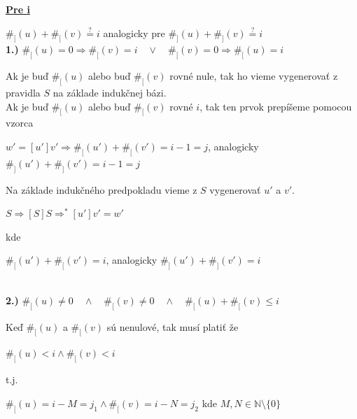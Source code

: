 \documentclass[11pt,a4paper]{article}
\begin{document}
\newpage
\underline{\textbf{Pre i}}
\begin{flushright}
\begin{minipage}{0.95\textwidth}

    $\#_{[}(u) + \#_{[}(v) \stackrel{\text{?}}{=} i$ analogicky pre $\#_{]}(u) + \#_{]}(v) \stackrel{\text{?}}{=} i$\\

    \textbf{1.)} $\#_{[}(u) = 0 \Rightarrow \#_{[}(v) = i \quad \vee \quad \#_{[}(v) = 0 \Rightarrow \#_{[}(u) = i$\\[-1em]
    \begin{flushright}
    \begin{minipage}{0.95\textwidth}
        Ak je buď $\#_{[}(u)$ alebo buď $\#_{[}(v)$ rovné nule, tak ho vieme vygenerovať z pravidla $S$ na základe indukčnej bázi.\\

        Ak je buď $\#_{[}(u)$ alebo buď $\#_{[}(v)$ rovné $i$, tak ten prvok prepíšeme pomocou vzorca
        \begin{center}
        $w'=[u']v' \Rightarrow \#_{[}(u') + \#_{[}(v') = i-1 = j$, analogicky $\#_{]}(u') + \#_{]}(v') = i-1 = j$
        \end{center}
        Na základe indukčného predpokladu vieme z $S$ vygenerovať $u'$ a $v'$.
        \begin{center}
            $S \Rightarrow [S]S \Rightarrow^{*} [u']v' = w'$
        \end{center}
        kde
        \begin{center}
            $\#_{[}(u') + \#_{[}(v') = i$, analogicky $\#_{]}(u') + \#_{]}(v') = i$
        \end{center}
    \end{minipage}
    \end{flushright}

    \hfill\\[-1em]

    \textbf{2.)} $\#_{[}(u) \neq 0 \quad \wedge \quad \#_{[}(v) \neq 0 \quad \wedge \quad \#_{[}(u)+\#_{[}(v) \leq i$\\[-1em]
    \begin{flushright}
    \begin{minipage}{0.95\textwidth}
        Keď $\#_{[}(u)$ a $\#_{[}(v)$ sú nenulové, tak musí platiť že
        \begin{center}
            $\#_{[}(u) < i \wedge \#_{[}(v) < i$
        \end{center}
        t.j.
        \begin{center}
            $\#_{[}(u) = i - M = j_1 \wedge \#_{[}(v) = i - N = j_2$ kde $M,N \in \mathbb{N} \setminus \{0\}$
        \end{center}
    \end{minipage}
    \end{flushright}
\end{minipage}
\end{flushright}
\end{document}
